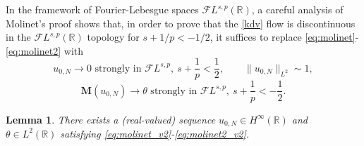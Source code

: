 \documentclass[%
11pt,  reqno]{amsart}
\newcommand{\5}{\textup{V}}
\newtheorem{lemma}[theorem]{Lemma}
\theoremstyle{remark}
\newcommand{\R}{\mathbb{R}}
\newcommand{\MMb}{\mathbf{M}}
\numberwithin{equation}{section}
\numberwithin{theorem}{section}
\begin{document}
\bigskip

In the framework of Fourier-Lebesgue spaces $\mathcal{F}L^{s,p}(\R)$, a careful analysis of Molinet's proof shows that, in order to prove that the \eqref{kdv} flow is discontinuous in the $\mathcal{F}L^{s,p}(\R)$ topology for $s+1/p<-1/2$, it suffices to replace \eqref{eq:molinet}-\eqref{eq:molinet2} with
\begin{equation}\label{eq:molinet_v2}
	u_{0,N}\to 0 \mbox{ strongly in }\mathcal{F}L^{s,p},\ s+\frac1p<\frac12,\qquad \|u_{0,N}\|_{L^2}\sim 1,
\end{equation}
\begin{equation}\label{eq:molinet2_v2}
 \MMb(u_{0,N}) \to \theta \mbox{ strongly in }\mathcal{F}L^{s,p}, \ s+\frac1p<-\frac12.
\end{equation}
\begin{lemma}
	There exists a (real-valued) sequence $u_{0,N}\in H^\infty(\R)$ and $\theta\in L^2(\R)$ satisfying \eqref{eq:molinet_v2}-\eqref{eq:molinet2_v2}.
\end{lemma}
\end{document}
